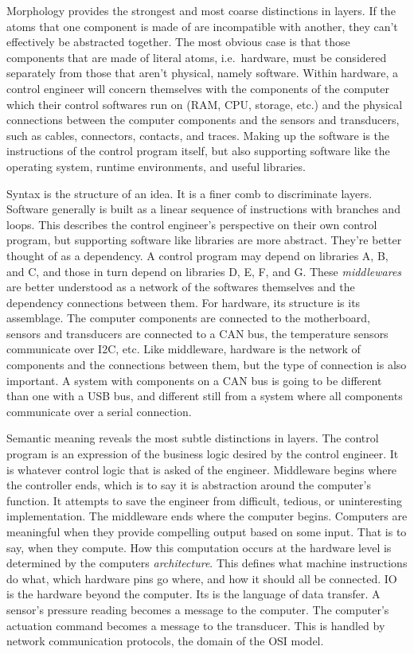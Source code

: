\documentclass[english,12pt,a4paper,pdftex,eng,utf8]{aaltothesis}
\begin{document}
Morphology provides the strongest and most coarse distinctions in layers.  If the atoms that one component is made of are incompatible with another, they can't effectively be abstracted together.  The most obvious case is that those components that are made of literal atoms, i.e.\ hardware, must be considered separately from those that aren't physical, namely software.  Within hardware, a control engineer will concern themselves with the components of the computer which their control softwares run on (RAM, CPU, storage, etc.) and the physical connections between the computer components and the sensors and transducers, such as cables, connectors, contacts, and traces.  Making up the software is the instructions of the control program itself, but also supporting software like the operating system, runtime environments, and useful libraries.

Syntax is the structure of an idea.  It is a finer comb to discriminate layers.  Software generally is built as a linear sequence of instructions with branches and loops.  This describes the control engineer's perspective on their own control program, but supporting software like libraries are more abstract.  They're better thought of as a dependency.  A control program may depend on libraries A, B, and C, and those in turn depend on libraries D, E, F, and G.  These {\it middlewares\/} are better understood as a network of the softwares themselves and the dependency connections between them.  For hardware, its structure is its assemblage.  The computer components are connected to the motherboard, sensors and transducers are connected to a CAN bus, the temperature sensors communicate over I2C, etc.  Like middleware, hardware is the network of components and the connections between them, but the type of connection is also important.  A system with components on a CAN bus is going to be different than one with a USB bus, and different still from a system where all components communicate over a serial connection.

Semantic meaning reveals the most subtle distinctions in layers.  The control program is an expression of the business logic desired by the control engineer.  It is whatever control logic that is asked of the engineer.  Middleware begins where the controller ends, which is to say it is abstraction around the computer's function.  It attempts to save the engineer from difficult, tedious, or uninteresting implementation.  The middleware ends where the computer begins.  Computers are meaningful when they provide compelling output based on some input.  That is to say, when they compute.  How this computation occurs at the hardware level is determined by the computers {\it architecture}.  This defines what machine instructions do what, which hardware pins go where, and how it should all be connected.  IO is the hardware beyond the computer.  Its is the language of data transfer.  A sensor's pressure reading becomes a message to the computer.  The computer's actuation command becomes a message to the transducer.  This is handled by network communication protocols, the domain of the OSI model.
\end{document}
